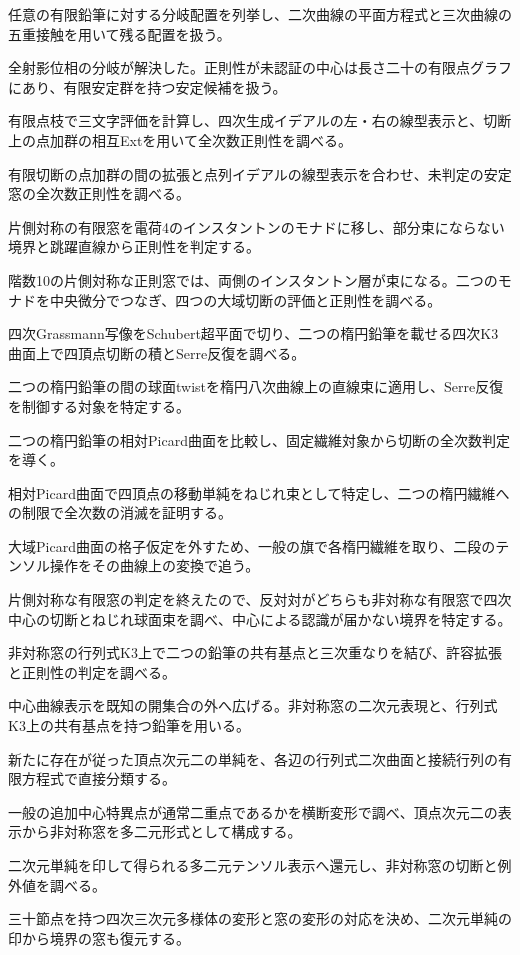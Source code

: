 \documentclass[11pt,a4paper]{ltjsarticle}
\begin{document}
任意の有限鉛筆に対する分岐配置を列挙し、二次曲線の平面方程式と三次曲線の五重接触を用いて残る配置を扱う。

全射影位相の分岐が解決した。正則性が未認証の中心は長さ二十の有限点グラフにあり、有限安定群を持つ安定候補を扱う。

有限点枝で三文字評価を計算し、四次生成イデアルの左・右の線型表示と、切断上の点加群の相互Extを用いて全次数正則性を調べる。

有限切断の点加群の間の拡張と点列イデアルの線型表示を合わせ、未判定の安定窓の全次数正則性を調べる。

片側対称の有限窓を電荷4のインスタントンのモナドに移し、部分束にならない境界と跳躍直線から正則性を判定する。

階数10の片側対称な正則窓では、両側のインスタントン層が束になる。二つのモナドを中央微分でつなぎ、四つの大域切断の評価と正則性を調べる。

四次Grassmann写像をSchubert超平面で切り、二つの楕円鉛筆を載せる四次K3曲面上で四頂点切断の積とSerre反復を調べる。

二つの楕円鉛筆の間の球面twistを楕円八次曲線上の直線束に適用し、Serre反復を制御する対象を特定する。

二つの楕円鉛筆の相対Picard曲面を比較し、固定繊維対象から切断の全次数判定を導く。

相対Picard曲面で四頂点の移動単純をねじれ束として特定し、二つの楕円繊維への制限で全次数の消滅を証明する。

大域Picard曲面の格子仮定を外すため、一般の旗で各楕円繊維を取り、二段のテンソル操作をその曲線上の変換で追う。

片側対称な有限窓の判定を終えたので、反対対がどちらも非対称な有限窓で四次中心の切断とねじれ球面束を調べ、中心による認識が届かない境界を特定する。

非対称窓の行列式K3上で二つの鉛筆の共有基点と三次重なりを結び、許容拡張と正則性の判定を調べる。

中心曲線表示を既知の開集合の外へ広げる。非対称窓の二次元表現と、行列式K3上の共有基点を持つ鉛筆を用いる。

新たに存在が従った頂点次元二の単純を、各辺の行列式二次曲面と接続行列の有限方程式で直接分類する。

一般の追加中心特異点が通常二重点であるかを横断変形で調べ、頂点次元二の表示から非対称窓を多二元形式として構成する。

二次元単純を印して得られる多二元テンソル表示へ還元し、非対称窓の切断と例外値を調べる。

三十節点を持つ四次三次元多様体の変形と窓の変形の対応を決め、二次元単純の印から境界の窓も復元する。
\end{document}
